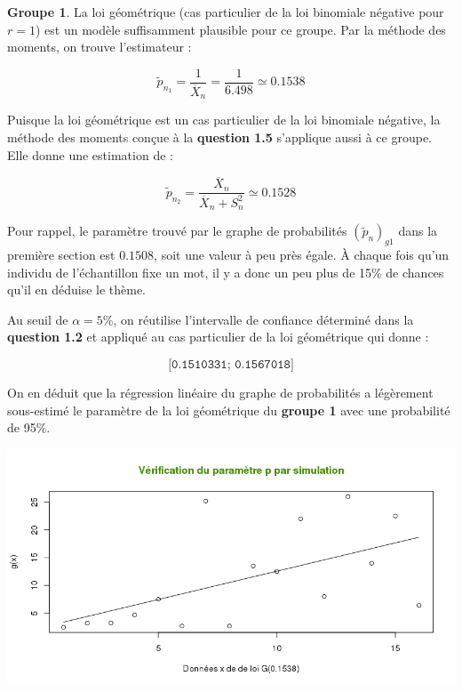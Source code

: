 \documentclass[a4paper,11pt]{article}
\theoremstyle{nonumberplain}
\theoremstyle{nonumberplain}
\theoremstyle{nonumberplain}
\theoremstyle{nonumberplain}
\begin{document}
      \bigskip
      \textbf{Groupe 1}. \newline
      La loi géométrique (cas particulier de la loi binomiale négative pour $r = 1$)
      est un modèle suffisamment plausible pour ce groupe. Par la méthode des moments, on
      trouve l'estimateur :

      \[
            \tilde{p}_{n_1} = \frac{1}{\overline{X}_n} = \frac{1}{6.498} \simeq 0.1538
      \]

      Puisque la loi géométrique est un cas particulier de la loi binomiale
      négative, la méthode des moments conçue à la \textbf{question 1.5} s'applique aussi
      à ce groupe. Elle donne une estimation de :

      \[
            \tilde{p}_{n_2} = \frac{\overline{X}_n}{\overline{X}_n + S_n^{2}} \simeq 0.1528
      \]

      \medskip
      Pour rappel, le paramètre trouvé par le graphe de probabilités
      $(\tilde{p}_n)_{g1}$ dans la première section est $0.1508$, soit une valeur à
      peu près égale. \`{A} chaque fois qu'un individu de l'échantillon fixe
      un mot, il y a donc un peu plus de 15\% de chances qu'il en déduise le thème.

      \medskip
      Au seuil de $\alpha = 5\%$, on réutilise l'intervalle de confiance déterminé dans
      la \textbf{question 1.2} et appliqué au cas particulier de la loi géométrique qui donne :

      \[
            \texttt{[0.1510331; 0.1567018]}
      \]

      On en déduit que la régression linéaire du graphe de probabilités a légèrement sous-estimé
      le paramètre de la loi géométrique du \textbf{groupe 1} avec une probabilité de 95\%.

      \vspace{-1.5ex}
      \begin{center}
          \includegraphics[scale=0.65]{images/p2_q2_verif1.png}
      \end{center}
\end{document}
